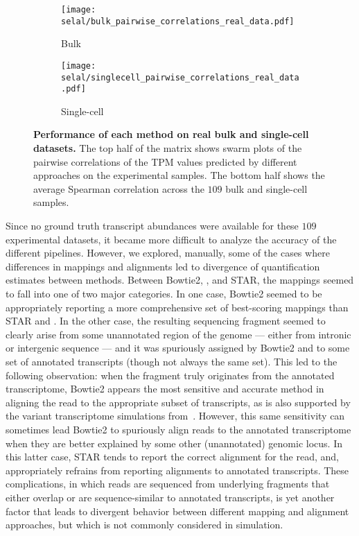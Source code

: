 \begin{figure}[t!]
    \centering
     \begin{subfigure}[t]{0.7\textwidth}
     \centering
  	  	\texttt{[image: selal/bulk\_pairwise\_correlations\_real\_data.pdf]}
		\caption{Bulk}
    \end{subfigure}
     \begin{subfigure}[t]{0.7\textwidth}
     \centering
  	  	\texttt{[image: selal/singlecell\_pairwise\_correlations\_real\_data.pdf]}
		\caption{Single-cell}
    \end{subfigure}     
     \caption{\textbf{Performance of each method on real bulk and single-cell datasets.} 
      The top half of the matrix shows swarm plots of the pairwise correlations of the TPM values predicted by different
       approaches on the experimental samples. The bottom half shows the average
       Spearman correlation across the $109$ bulk and single-cell samples.}
    \label{fig:swarm}
\end{figure}


Since no ground truth transcript abundances were available for these $109$
experimental datasets, it became more difficult to analyze the accuracy of the
different pipelines. However, we explored, manually, some of
  the cases where differences in mappings and alignments led to divergence of quantification
  estimates between methods. Between Bowtie2, \qm, and STAR, the mappings seemed to fall
  into one of two major categories. In one case, Bowtie2 seemed to be appropriately
  reporting a more comprehensive set of best-scoring mappings than STAR and \qm.
  In the other case, the resulting sequencing fragment seemed to clearly arise from some unannotated
  region of the genome --- either from intronic or intergenic sequence --- and it was
  spuriously assigned by Bowtie2 and \qm to some set of annotated transcripts (though not
  always the same set).  This led to the following observation: when the fragment truly originates 
  from the annotated transcriptome, Bowtie2 appears the most sensitive and accurate method in aligning the read to
  the appropriate subset of transcripts, as is also supported by the variant transcriptome
  simulations from~. However, this same sensitivity can
  sometimes lead Bowtie2 to spuriously align reads to the annotated
  transcriptome when they are better explained by some other (unannotated)
  genomic locus. In this latter case, STAR tends to report the correct alignment
  for the read, and, appropriately refrains from reporting alignments to
  annotated transcripts. These complications, in which reads are sequenced from
  underlying fragments that either overlap or are sequence-similar to annotated
  transcripts, is yet another factor that leads to divergent behavior between
  different mapping and alignment approaches, but which is not commonly
  considered in simulation.

